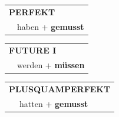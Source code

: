 \documentclass[10pt,a4paper]{revtex4-2}
\begin{document}
\begin{verbbox-modal}
    \vspace{10pt}
 
    \begin{tabular}{rl}
     \multicolumn{2}{l}{\textbf{PERFEKT}}\\
  &  haben + \textbf{gemusst}\\
  \end{tabular}
\hfill
   \begin{tabular}{rl}
   
    \multicolumn{2}{l}{\textbf{FUTURE I} }\\
  &  werden + \textbf{müssen}\\
 
  \end{tabular}
\hfill
   \begin{tabular}{rl}
      \multicolumn{2}{l}{\textbf{PLUSQUAMPERFEKT}}\\
  &  hatten + \textbf{gemusst}\\
  \end{tabular}
  
  \vspace{-5pt}
\end{verbbox-modal}
\end{document}
